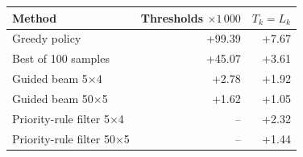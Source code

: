 \begin{tabular}{@{}lrr@{}}
\toprule
Method & Thresholds $\times 1\,000$ & $T_k = L_k$ \\
\midrule
Greedy policy & +99.39 & +7.67 \\
Best of 100 samples & +45.07 & +3.61 \\
Guided beam 5$\times$4 & +2.78 & +1.92 \\
Guided beam 50$\times$5 & +1.62 & +1.05 \\
Priority-rule filter 5$\times$4 & -- & +2.32 \\
Priority-rule filter 50$\times$5 & -- & +1.44 \\
\bottomrule
\end{tabular}
